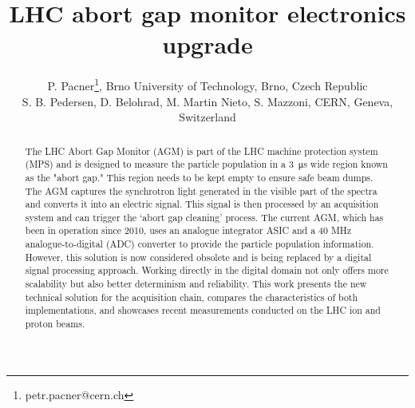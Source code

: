 



\title{LHC abort gap monitor electronics upgrade}

\author{P. Pacner\thanks{petr.pacner@cern.ch}, Brno University of Technology, Brno, Czech Republic \\
		S. B. Pedersen, D. Belohrad, M. Martin Nieto, S. Mazzoni, CERN, Geneva, Switzerland}
	
\maketitle

\begin{abstract}
    The LHC Abort Gap Monitor (AGM) is part of the LHC machine protection
    system (MPS) and is designed to measure the particle population in a \SI{3}{\micro\second}
    wide region known as the "abort gap." This region needs to be kept empty to
    ensure safe beam dumps. The AGM captures the synchrotron light generated in
    the visible part of the spectra and converts it into an electric signal.
    This signal is then processed by an acquisition system and can trigger the
    ‘abort gap cleaning’ process. The current AGM, which has been in operation
    since 2010, uses an analogue integrator ASIC and a 40 MHz
    analogue-to-digital (ADC) converter to provide the particle population
    information. However, this solution is now considered obsolete and is being
    replaced by a digital signal processing approach. Working directly in the
    digital domain not only offers more scalability but also better determinism
    and reliability. This work presents the new technical solution for the
    acquisition chain, compares the characteristics of both implementations,
    and showcases recent measurements conducted on the LHC ion and proton
    beams.
\end{abstract}

